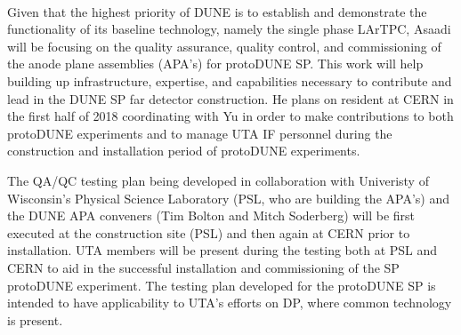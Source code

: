 ~\label{sec:proto-dune-sp-apa}

Given that the highest priority of DUNE is to establish and demonstrate the functionality of its baseline technology, namely the single phase LArTPC, Asaadi will be focusing on the quality assurance, quality control, and commissioning of the anode plane assemblies (APA's) for protoDUNE SP. This work will help building up infrastructure, expertise, and capabilities necessary to contribute and lead in the DUNE SP far detector construction.  He plans on resident at CERN in the first half of 2018 coordinating with Yu in order to make contributions to both protoDUNE experiments and to manage UTA IF personnel during the construction and installation period of protoDUNE experiments. 

The QA/QC testing plan being developed in collaboration with Univeristy of Wisconsin's Physical Science Laboratory (PSL, who are building the APA's) and the DUNE APA conveners (Tim Bolton and Mitch Soderberg) will be first executed at the construction site (PSL) and then again at CERN prior to installation. UTA members will be present during the testing both at PSL and CERN to aid in the successful installation and commissioning of the SP protoDUNE experiment. The testing plan developed for the protoDUNE SP is intended to have applicability to UTA's efforts on DP, where common technology is present. 
